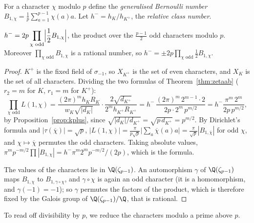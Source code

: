 For a character $\chi$ modulo $p$ define the \emph{generalised Bernoulli number} $B_{1,\chi}=\frac1p\sum_{a=1}^{p-1}\chi(a)a$. Let
$h^-=h_K/h_{K^+}$, the \emph{relative class number}.

\begin{theorem}[Kummer]\label{thm:hminus}
$\displaystyle h^-=2p\prod_{\chi\text{ odd}}\Bigl|\frac12B_{1,\chi}\Bigr|$, the product over the $\frac{p-1}2$ odd characters modulo $p$. Moreover
$\prod_{\chi\text{ odd}}B_{1,\chi}$ is a rational number, so $h^-=\pm2p\prod_{\chi\text{ odd}}\frac12B_{1,\chi}$.
\end{theorem}
\begin{proof}
$K^+$ is the fixed field of $\sigma_{-1}$, so $X_{K^+}$ is the set of even characters, and $X_K$ is the set of all characters. Dividing the
two formulas of Theorem~\ref{thm:zetaab} ($r_2=m$ for $K$, $r_1=m$ for $K^+$):
\[
\prod_{\chi\text{ odd}}L(1,\chi)=\frac{(2\pi)^mh_KR_K}{w_K\sqrt{|d_K|}}\cdot\frac{2\sqrt{d_{K^+}}}{2^mh_{K^+}R_{K^+}}
=h^-\,\frac{(2\pi)^m\,2^{m-1}\cdot2}{2p\cdot2^m\,p^{m/2}}=h^-\frac{\pi^m\,2^m}{2p\,p^{m/2}},
\]
by Proposition~\ref{prop:kplus}, since $\sqrt{|d_K|/d_{K^+}}=\sqrt{p\,d_{K^+}}=p^{m/2}$. By Dirichlet's formula and $|\tau(\overline\chi)|=\sqrt p$,
$|L(1,\chi)|=\frac\pi{p\sqrt p}\bigl|\sum_a\overline\chi(a)a\bigr|=\frac\pi{\sqrt p}|B_{1,\overline\chi}|$ for odd $\chi$, and $\chi\mapsto\overline\chi$
permutes the odd characters. Taking absolute values, $\pi^mp^{-m/2}\prod|B_{1,\chi}|=h^-\pi^m2^mp^{-m/2}/(2p)$, which is the formula.

The values of the characters lie in $\Q(\zeta_{p-1})$. An automorphism $\gamma$ of $\Q(\zeta_{p-1})$ maps $B_{1,\chi}$ to $B_{1,\gamma\circ\chi}$,
and $\gamma\circ\chi$ is again an odd character (it is a homomorphism, and $\gamma(-1)=-1$); so $\gamma$ permutes the factors of the product,
which is therefore fixed by the Galois group of $\Q(\zeta_{p-1})/\Q$, that is rational.
\end{proof}

To read off divisibility by $p$, we reduce the characters modulo a prime above $p$.

